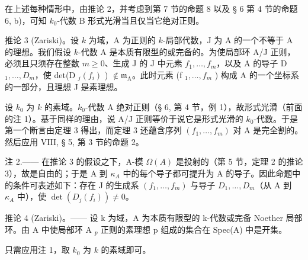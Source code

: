 在上述每种情形中，由推论 2，并考虑到第 7 节的命题 8 以及 § 6 第 4 节的命题 6, b)，可知 \(k_0\)-代数 B 形式光滑当且仅当它绝对正则。

推论 3 (Zariski)。设 \(k\) 为域，A 为正则的 \(k\)-局部代数，J 为 A 的一个不等于 A 的理想。我们假设 \(k\)-代数 A 是本质有限型的或完备的。为使局部环 A/J 正则，必须且只须存在整数 \(m \geqslant 0\)、生成 J 的 J 中元素 \(f_1, \ldots, f_m\)，以及 A 的导子 D \(_1, \ldots, D_m\)，使 det(D \(_j(f_i)\) ) \(\not\in \mathfrak{m}_{\mathrm{A}}\)。此时元素 (f \(_1, \ldots, f_m\) ) 构成 A 的一个坐标系的一部分，且理想 J 是素理想。

设 \(k_0\) 为 \(k\) 的素域。\(k_0\)-代数 A 绝对正则（§ 6, 第 4 节，例 1），故形式光滑（前面的注 1）。基于同样的理由，说 A/J 正则等价于说它是形式光滑的 \(k_0\)-代数。于是第一个断言由定理 3 得出，而定理 3 还蕴含序列 \((f_1,\ldots,f_m)\) 对 A 是完全割的。然后应用 VIII, § 5, 第 3 节的命题 2。

注 2.—— 在推论 3 的假设之下，A-模 \(\Omega(A)\) 是投射的（第 5 节，定理 2 的推论 3），故是自由的；于是 A 到 \(\kappa_{A}\) 中的每个导子都可提升为 A 的导子。因此命题中的条件可表述如下：存在 J 的生成系 \((f_{1},\ldots,f_{m})\) 与导子 \(D_{1},\ldots,D_{m}\)（从 A 到 \(\kappa_{A}\) 中），使 \(\det(D_{j}(f_{i}))\neq0\)。

推论 4 (Zariski)。—— 设 k 为域，A 为本质有限型的 k-代数或完备 Noether 局部环。由 A 中使局部环 A \(_{p}\) 正则的素理想 p 组成的集合在 Spec(A) 中是开集。

只需应用注 1，取 \(k_0\) 为 \(k\) 的素域即可。

